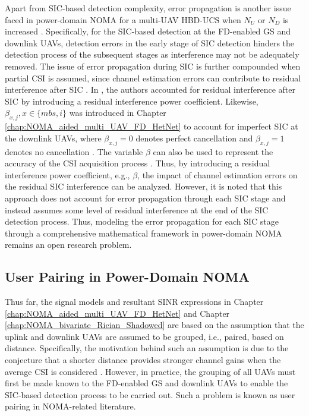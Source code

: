 Apart from SIC-based detection complexity, error propagation is another issue faced in power-domain NOMA for a multi-UAV HBD-UCS when $N_U$ or $N_D$ is increased \cite{islam2017power,dai2018survey}. Specifically, for the SIC-based detection at the FD-enabled GS and downlink UAVs, detection errors in the early stage of SIC detection hinders the detection process of the subsequent stages as interference may not be adequately removed. The issue of error propagation during SIC is further compounded when partial CSI is assumed, since channel estimation errors can contribute to residual interference after SIC \cite{dai2018survey}. In \cite{wang2017sir,zhang2017downlink,kader2018coordinated,kader2018full}, the authors accounted for residual interference after SIC by introducing a residual interference power coefficient. Likewise, $\beta_{x,j}, x \in \{mbs, i\}$ was introduced in Chapter \ref{chap:NOMA_aided_multi_UAV_FD_HetNet} to account for imperfect SIC at the downlink UAVs, where $\beta_{x,j} = 0$ denotes perfect cancellation and $\beta_{x,j} = 1$ denotes no cancellation \cite{kader2018full}. The variable $\beta$ can also be used to represent the accuracy of the CSI acquisition process \cite{wang2017sir}. Thus, by introducing a residual interference power coefficient, e.g., $\beta$, the impact of channel estimation errors on the residual SIC interference can be analyzed. However, it is noted that this approach does not account for error propagation through each SIC stage and instead assumes some level of residual interference at the end of the SIC detection process. Thus, modeling the error propagation for each SIC stage through a comprehensive mathematical framework in power-domain NOMA remains an open research problem.

\subsection{User Pairing in Power-Domain NOMA}
Thus far, the signal models and resultant SINR expressions in Chapter \ref{chap:NOMA_aided_multi_UAV_FD_HetNet} and Chapter \ref{chap:NOMA_bivariate_Rician_Shadowed} are based on the assumption that the uplink and downlink UAVs are assumed to be grouped, i.e., paired, based on distance. Specifically, the motivation behind such an assumption is due to the conjecture that a shorter distance provides stronger channel gains when the average CSI is considered \cite{kader2018full}. However, in practice, the grouping of all UAVs must first be made known to the FD-enabled GS and downlink UAVs to enable the SIC-based detection process to be carried out. Such a problem is known as user pairing in NOMA-related literature. 

